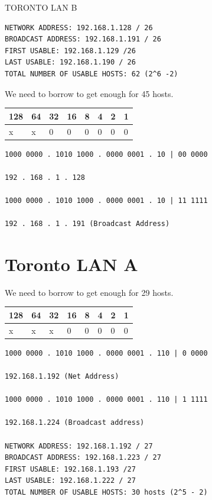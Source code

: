 TORONTO LAN B

\begin{lstlisting}
NETWORK ADDRESS: 192.168.1.128 / 26
BROADCAST ADDRESS: 192.168.1.191 / 26
FIRST USABLE: 192.168.1.129 /26
LAST USABLE: 192.168.1.190 / 26
TOTAL NUMBER OF USABLE HOSTS: 62 (2^6 -2)
\end{lstlisting}

We need to borrow to get enough for 45 hosts.

{\def\LTcaptype{none} %
\begin{longtable}[]{@{}llllllll@{}}
\toprule\noalign{}
128 & 64 & 32 & 16 & 8 & 4 & 2 & 1 \\
\midrule\noalign{}
\endhead
\bottomrule\noalign{}
\endlastfoot
x & x & 0 & 0 & 0 & 0 & 0 & 0 \\
\end{longtable}
}

\begin{lstlisting}
1000 0000 . 1010 1000 . 0000 0001 . 10 | 00 0000

192 . 168 . 1 . 128

1000 0000 . 1010 1000 . 0000 0001 . 10 | 11 1111

192 . 168 . 1 . 191 (Broadcast Address)
\end{lstlisting}

\section{Toronto LAN A}\label{toronto-lan-a}

We need to borrow to get enough for 29 hosts.

{\def\LTcaptype{none} %
\begin{longtable}[]{@{}llllllll@{}}
\toprule\noalign{}
128 & 64 & 32 & 16 & 8 & 4 & 2 & 1 \\
\midrule\noalign{}
\endhead
\bottomrule\noalign{}
\endlastfoot
x & x & x & 0 & 0 & 0 & 0 & 0 \\
\end{longtable}
}

\begin{lstlisting}
1000 0000 . 1010 1000 . 0000 0001 . 110 | 0 0000

192.168.1.192 (Net Address)

1000 0000 . 1010 1000 . 0000 0001 . 110 | 1 1111

192.168.1.224 (Broadcast address)

NETWORK ADDRESS: 192.168.1.192 / 27
BROADCAST ADDRESS: 192.168.1.223 / 27
FIRST USABLE: 192.168.1.193 /27
LAST USABLE: 192.168.1.222 / 27
TOTAL NUMBER OF USABLE HOSTS: 30 hosts (2^5 - 2)
\end{lstlisting}

